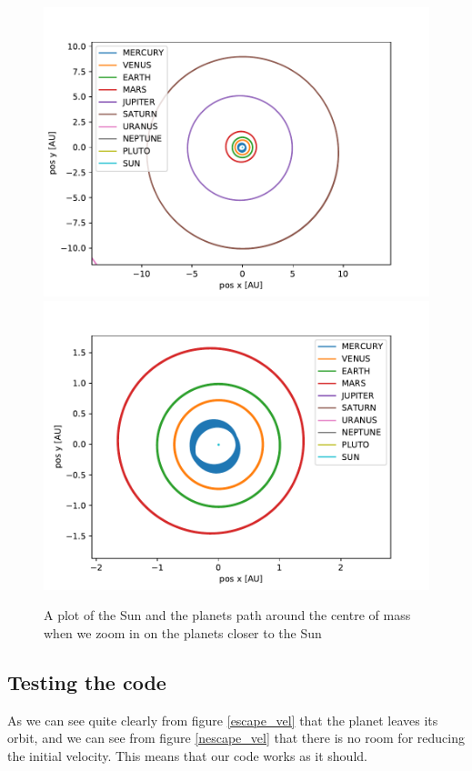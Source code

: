 \documentclass[a4paper]{article}
\begin{document}
\begin{figure}[h!]
	\centering 
	\includegraphics[scale=0.56]{../opp_f2.pdf}
	\includegraphics[scale=0.56]{../opp_f3.pdf}
	\caption{A plot of the Sun and the planets path around the centre of mass when we zoom in on the planets closer to the Sun}
	\label{f_1_1}
\end{figure}
\subsection{Testing the code}
As we can see quite clearly from figure \ref{escape_vel} that the planet leaves its orbit, and we can see from figure \ref{nescape_vel} that there is no room for reducing the initial velocity. This means that our code works as it should.
\end{document}
